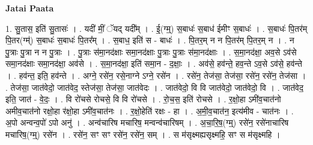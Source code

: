 \documentclass[17pt]{extarticle}
\begin{document}
\textbf{Jatai Paata} \newline

1. सु॒तास॒ इति॑ सु॒तासः॑ । . यदी॑ मीं॒ ॅयद् यदी᳚म् । . ई॒(ग्म्॒) स॒बाधः॑ स॒बाध॑ ईमीꣳ स॒बाधः॑ । . स॒बाधः॑ पि॒तर॑म् पि॒तर(ग्म्॑) स॒बाधः॑ स॒बाधः॑ पि॒तर᳚म् । . स॒बाध॒ इति॑ स - बाधः॑ । . पि॒तर॒म् न न पि॒तर॑म् पि॒तर॒म् न । . न पु॒त्राः पु॒त्रा न न पु॒त्राः । . पु॒त्राः स॑मा॒नद॑क्षाः समा॒नद॑क्षाः पु॒त्राः पु॒त्राः स॑मा॒नद॑क्षाः । . स॒मा॒नद॑क्षा॒ अव॒से ऽव॑से समा॒नद॑क्षाः समा॒नद॑क्षा॒ अव॑से । . स॒मा॒नद॑क्षा॒ इति॑ समा॒न - द॒क्षाः॒ । . अव॑से॒ हव॑न्ते॒ हव॒न्ते ऽव॒से ऽव॑से॒ हव॑न्ते । . हव॑न्त॒ इति॒ हव॑न्ते । . अग्ने॒ रसे॑न॒ रसे॒नाग्ने ऽग्ने॒ रसे॑न । . रसे॑न॒ तेज॑सा॒ तेज॑सा॒ रसे॑न॒ रसे॑न॒ तेज॑सा । . तेज॑सा॒ जात॑वेदो॒ जात॑वेद॒ स्तेज॑सा॒ तेज॑सा॒ जात॑वेदः । . जात॑वेदो॒ वि वि जात॑वेदो॒ जात॑वेदो॒ वि । . जात॑वेद॒ इति॒ जात॑ - वे॒दः॒ । . वि रो॑चसे रोचसे॒ वि वि रो॑चसे । . रो॒च॒स॒ इति॑ रोचसे । . र॒क्षो॒हा ऽमी॑व॒चात॑नो अमीव॒चात॑नो रक्षो॒हा र॑क्षो॒हा ऽमी॑व॒चात॑नः । . र॒क्षो॒हेति॑ रक्षः - हा । . अ॒मी॒व॒चात॑न॒ इत्य॑मीव - चात॑नः । . अ॒पो अन्वन्व॒पो॑ ऽपो अनु॑ । . अन्व॑चारिष मचारिष॒ मन्वन्व॑चारिषम् । . अ॒चा॒रि॒ष॒(ग्म्॒) रसे॑न॒ रसे॑नाचारिष मचारिष॒(ग्म्॒) रसे॑न । . रसे॑न॒ सꣳ सꣳ रसे॑न॒ रसे॑न॒ सम् । . स म॑सृक्ष्मह्यसृक्ष्महि॒ सꣳ स म॑सृक्ष्महि । \newline
\end{document}
